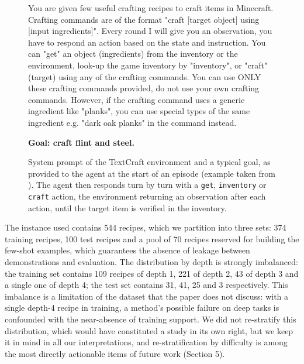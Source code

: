 \documentclass[11pt,a4paper]{article}
\begin{document}
\begin{figure}[htbp]
\centering
\begin{tcolorbox}[
    colback=gray!4, colframe=black!65,
    title=\textbf{Example TextCraft task --- system prompt and goal},
    fonttitle=\small, width=0.96\textwidth,
    boxrule=0.6pt, arc=2mm, left=3mm, right=3mm, top=2mm, bottom=2mm]
{\small\ttfamily
You are given few useful crafting recipes to craft items in Minecraft. Crafting commands are of the format \mbox{"craft} [target object] using [input \mbox{ingredients]"}. Every round I will give you an observation, you have to respond an action based on the state and instruction. You can "get" an object (ingredients) from the inventory or the environment, look-up the game inventory by "inventory", or "craft" (target) using any of the crafting commands. You can use ONLY these crafting commands provided, do not use your own crafting commands. However, if the crafting command uses a generic ingredient like "planks", you can use special types of the same ingredient e.g. "dark oak planks" in the command instead.

\medskip
\textbf{Goal: craft flint and steel.}
}
\end{tcolorbox}
\caption{System prompt of the TextCraft environment and a typical goal, as provided to the agent at the start of an episode (example taken from \cite{xi_agentgym-rl_2025}). The agent then responds turn by turn with a \texttt{get}, \texttt{inventory} or \texttt{craft} action, the environment returning an observation after each action, until the target item is verified in the inventory.}
\label{fig:textcraft_episode}
\end{figure}


The instance used contains 544 recipes, which we partition into three sets: 374 training recipes, 100 test recipes and a pool of 70 recipes reserved for building the few-shot examples, which guarantees the absence of leakage between demonstrations and evaluation. The distribution by depth is strongly imbalanced: the training set contains 109 recipes of depth 1, 221 of depth 2, 43 of depth 3 and a single one of depth 4; the test set contains 31, 41, 25 and 3 respectively. This imbalance is a limitation of the dataset that the paper does not discuss: with a single depth-4 recipe in training, a method's possible failure on deep tasks is confounded with the near-absence of training support. We did not re-stratify this distribution, which would have constituted a study in its own right, but we keep it in mind in all our interpretations, and re-stratification by difficulty is among the most directly actionable items of future work (Section 5).
\end{document}
